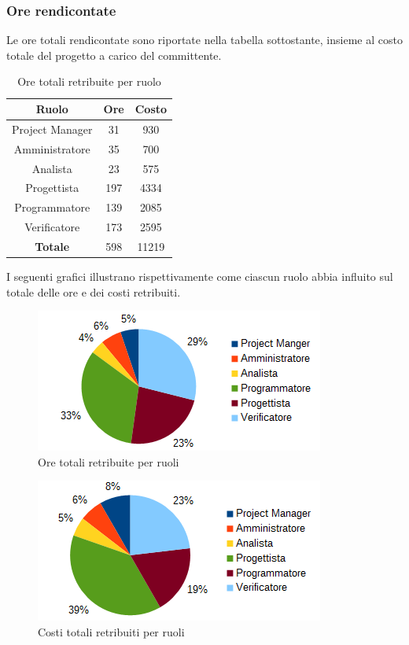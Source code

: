 		\subsubsection{Ore rendicontate}
		Le ore totali rendicontate sono riportate nella tabella sottostante, insieme al costo totale del progetto a carico del committente. \\
		\begin{table}[H]
		\centering
		\begin{tabular}{|c|c|c|}
			\hline
			\textbf{Ruolo}		& \textbf{Ore}	& \textbf{Costo} \\
			\hline
			Project Manager		& 31			& 930	\\
			Amministratore		& 35			& 700	\\
			Analista			& 23			& 575	\\
			Progettista			& 197			& 4334	\\
			Programmatore		& 139			& 2085	\\
			Verificatore		& 173			& 2595	\\
			\hline
			\textbf{Totale}		& 598			& 11219	\\
			\hline
		\end{tabular}
		\caption{Ore totali retribuite per ruolo}
		\end{table}
		I seguenti grafici illustrano rispettivamente come ciascun ruolo abbia influito sul totale delle ore e dei costi retribuiti. \\
		\begin{figure}[H]
		\centering
			\includegraphics[width=1\linewidth]{immagini/grafici/orario_rendicontato-torta.png}
			\caption{Ore totali retribuite per ruoli}
		\end{figure}
		\begin{figure}[H]
			\centering
			\includegraphics[width=1\linewidth]{immagini/grafici/orario_rendicontato-torta-costo.png}
			\caption{Costi totali retribuiti per ruoli}
		\end{figure}
